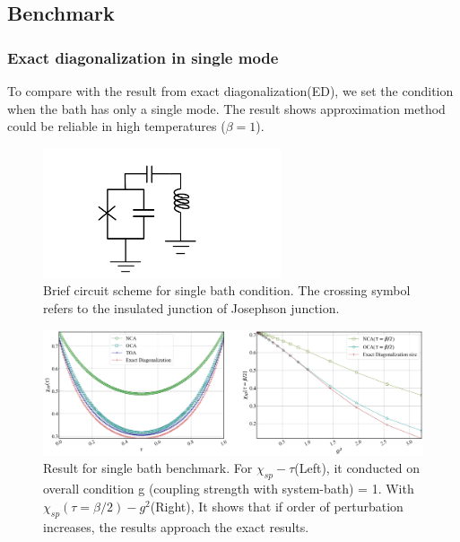 \documentclass{article}[12pt]
\begin{document}
\begin{spacing}{1.5}
\subsection{Benchmark}
\subsubsection*{Exact diagonalization in single mode}
To compare with the result from exact diagonalization(ED), we set the condition when the bath has only a single mode. 
The result shows approximation method could be reliable in high temperatures ($\beta = 1$).
\begin{figure}[htbp]
  \centerline{\includegraphics[width=7cm]{TexFigure/kps_singlebath.png}}
  \caption{Brief circuit scheme for single bath condition. The crossing symbol  refers to the insulated junction of Josephson junction.}
\end{figure}
\begin{figure}[htbp]
  \centerline{\includegraphics[width=15cm]{TexFigure/bench_single_two.png}}
  \caption{Result for single bath benchmark. For $\chi_{sp} - \tau$(Left), it conducted on overall condition g (coupling strength with system-bath) = 1.
  With $\chi_{sp}(\tau=\beta/2)-g^2$(Right), It shows that if order of perturbation increases, the results approach the exact results.}
\end{figure}

\end{spacing}
\end{document}
